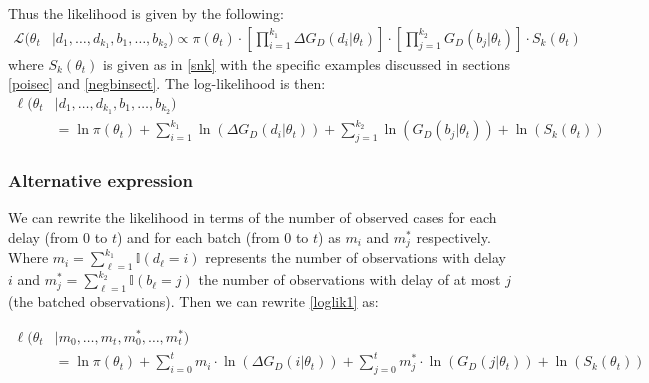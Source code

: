 \documentclass{article}
\begin{document}
Thus the likelihood is given by the following:
\begin{equation}\label{grallikelihood}
    \begin{aligned}
    \mathcal{L}(\theta_t & | d_1, \dots, d_{k_1}, b_1, \dots, b_{k_2})  
    \propto  \pi(\theta_t)\cdot  \left[ \prod\limits_{i=1}^{k_1} \Delta G_D(d_i|\theta_t) \right]\cdot \left[ \prod\limits_{j=1}^{k_2} G_D(b_j|\theta_t)\right] \cdot  S_k(\theta_t)
    \end{aligned}
\end{equation}
where $S_k(\theta_t)$ is given as in \eqref{snk} with the specific examples discussed in sections \ref{poisec} and \ref{negbinsect}. The log-likelihood is then:
\begin{equation}\label{loglik1}
    \begin{aligned}
        \ell(\theta_t & | d_1, \dots, d_{k_1}, b_1, \dots, b_{k_2}) 
        \\ & = \ln{\pi(\theta_t)} + \sum\limits_{i=1}^{k_1} \ln{\left(\Delta G_D(d_i|\theta_t)\right)} +\sum\limits_{j=1}^{k_2} \ln{\left(G_D(b_j|\theta_t)\right)} + \ln{\left(S_k(\theta_t)\right)}
    \end{aligned}
\end{equation}
\subsubsection{Alternative expression}
We can rewrite the likelihood in terms of the number of observed cases for each delay (from $0$ to $t$) and for each batch (from $0$ to $t$) as $m_i$ and $m^{*}_j$ respectively. Where $m_i = \sum_{\ell=1}^{k_1} \mathbb{I}(d_{\ell} = i)$ represents the number of observations with delay $i$ and $m_j^{*} = \sum_{\ell=1}^{k_2} \mathbb{I}(b_{\ell} = j)$ the number of observations with delay of at most $j$ (the batched observations). Then we can rewrite \eqref{loglik1} as:

\begin{equation}\label{logliksimplified}
    \begin{aligned}
        \ell(\theta_t & | m_0, \dots, m_{t}, m_0^{*}, \dots, m_{t}^{*}) 
        \\ & = \ln{\pi(\theta_t)} + \sum\limits_{i=0}^{t} m_i \cdot \ln{\left(\Delta G_D(i|\theta_t)\right)} +\sum\limits_{j=0}^{t} m_j^{*} \cdot \ln{\left(G_D(j|\theta_t)\right)} + \ln{\left(S_k(\theta_t)\right)}
    \end{aligned}
\end{equation}
\end{document}
